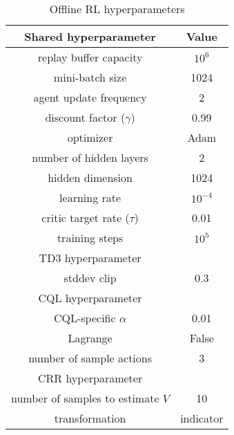 \begin{table}[h]
    \centering
    \begin{tabular}{|c|c|}
        \hline
        Shared hyperparameter & Value \\
        \hline
        replay buffer capacity & $10^6$ \\
        mini-batch size & 1024 \\
        agent update frequency & 2 \\
        discount factor ($\gamma$) & 0.99 \\
        optimizer & Adam \\
        number of hidden layers & 2 \\
        hidden dimension & 1024 \\
        learning rate & $10^{-4}$ \\
        critic target rate ($\tau$) & 0.01 \\
        training steps & $10^5$ \\
        \hline
        TD3 hyperparameter &  \\
        \hline
        stddev clip & 0.3 \\
        \hline
        CQL hyperparameter &  \\
        \hline
        CQL-specific $\alpha$ & 0.01 \\
        Lagrange & False \\
        number of sample actions & 3 \\
        \hline
        CRR hyperparameter &  \\
        \hline
        number of samples to estimate $V$ & 10 \\
        transformation & indicator \\
        \hline
    \end{tabular}
    \caption{Offline RL hyperparameters}
    \label{tab:orl_hyperparams}
\end{table}